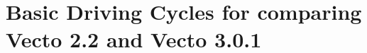 \newpage




\appendix

\section{Basic Driving Cycles for comparing Vecto 2.2 and Vecto 3.0.1}
\label{sec:driving_cycles_comparison}

